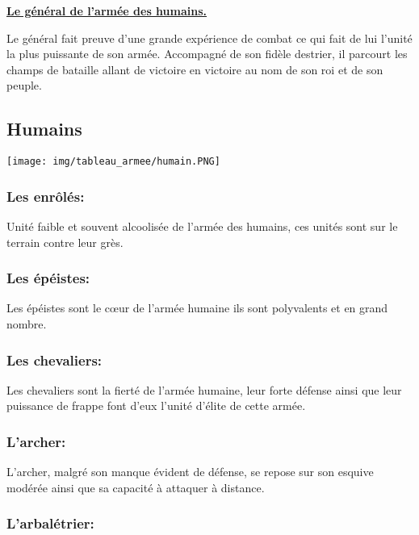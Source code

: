 \documentclass[a4paper]{article}
\begin{document}
	\quad\underline{\textbf{Le général de l'armée des humains.}}
	
	\quad Le général fait preuve d'une grande expérience de combat ce qui fait de lui l'unité la plus puissante de son armée. Accompagné de son fidèle destrier, il parcourt les champs de bataille allant de victoire en victoire au nom de son roi et de son peuple.
	
	\newpage
\subsection{Humains}


	\texttt{[image: img/tableau\_armee/humain.PNG]}
	
	\subsubsection{Les enrôlés: }
	
	\quad Unité faible et souvent alcoolisée de l'armée des humains, ces unités sont sur le terrain contre leur grès. 
	
	\subsubsection{Les épéistes: }
	
	\quad Les épéistes sont le cœur de l'armée humaine ils sont polyvalents et en grand nombre. 
	
	\subsubsection{Les chevaliers: }
	
	\quad Les chevaliers sont la fierté de l'armée humaine, leur forte défense ainsi que leur puissance de frappe font d'eux l'unité d'élite de cette armée.
	
	\subsubsection{L'archer: }
	
	\quad L'archer, malgré son manque évident de défense, se repose sur son esquive modérée ainsi que sa capacité à attaquer à distance.
	
	\subsubsection{L'arbalétrier: }
	
\end{document}
